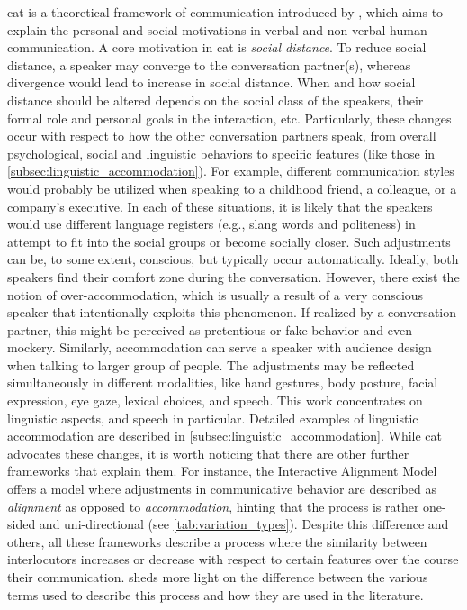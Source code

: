 \Acf{cat} is a theoretical framework of communication introduced by \citet{Giles1973mobility, Giles1991CAT, Giles2007CAT}, which aims to explain the personal and social motivations in verbal and non-verbal human communication.
A core motivation in \ac{cat} is \emph{social distance}.
To reduce social distance, a speaker may converge to the conversation partner(s), whereas divergence would lead to increase in social distance.
When and how social distance should be altered depends on the social class of the speakers, their formal role and personal goals in the interaction, etc.
Particularly, these changes occur with respect to how the other conversation partners speak, from overall psychological, social and linguistic behaviors to specific features (like those in \cref{subsec:linguistic_accommodation}).
For example, different communication styles would probably be utilized when speaking to a childhood friend, a colleague, or a company's executive.
In each of these situations, it is likely that the speakers would use different language registers (e.g., slang words and politeness) in attempt to fit into the social groups or become socially closer.
Such adjustments can be, to some extent, conscious, but typically occur automatically.
Ideally, both speakers find their comfort zone during the conversation.
However, there exist the notion of over-accommodation, which is usually a result of a very conscious speaker that intentionally exploits this phenomenon.
If realized by a conversation partner, this might be perceived as pretentious or fake behavior and even mockery.
Similarly, accommodation can serve a speaker with audience design when talking to larger group of people.
The adjustments may be reflected simultaneously in different modalities, like hand gestures, body posture, facial expression, eye gaze, lexical choices, and speech.
This work concentrates on linguistic aspects, and speech in particular.
Detailed examples of linguistic accommodation are described in \cref{subsec:linguistic_accommodation}.
While \ac{cat} advocates these changes, it is worth noticing that there are other further frameworks that explain them.
For instance, the Interactive Alignment Model \citep{Pickering2004behavioral, Pickering2013integrated} offers a model where adjustments in communicative behavior are described as \emph{alignment} as opposed to \emph{accommodation}, hinting that the process is rather one-sided and uni-directional (see \cref{tab:variation_types}).
Despite this difference and others, all these frameworks describe a process where the similarity between interlocutors increases or decrease with respect to certain features over the course their communication.
 sheds more light on the difference between the various terms used to describe this process and how they are used in the literature.

